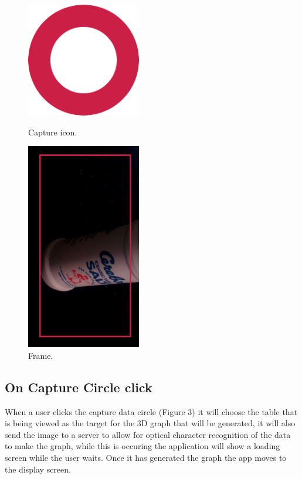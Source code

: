 \documentclass[a4paper,12pt]{article}
\begin{document}
\begin{figure}[H]
  \centering
  \begin{minipage}[b]{0.4\textwidth}
    \includegraphics[width=50mm]{images/capture.png}
    \caption{Capture icon.}
  \end{minipage}
  \hfill
  \begin{minipage}[b]{0.4\textwidth}
    \includegraphics[width=50mm]{images/frame.png}
    \caption{Frame.}
  \end{minipage}
\end{figure}


\subsection{On Capture Circle click}
When a user clicks the capture data circle (Figure 3) it will choose the table that is being viewed as the target for the 3D graph that will be generated, it will also send the image to a server to allow for optical character recognition of the data to make the graph, while this is occuring the application will show a loading screen while the user waits. Once it has generated the graph the app moves to the display screen.
\end{document}
